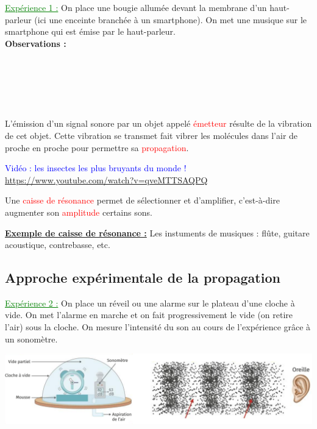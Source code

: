 \textcolor{green}{\underline{Expérience 1 :}} On place une bougie allumée devant la membrane d'un haut-parleur (ici une enceinte branchée à un smartphone). On met une musique sur le smartphone qui est émise par le haut-parleur.\\
\textbf{Observations :} \\
\\
\\
\\
\\
\\

\begin{tcolorbox}[colback=red!5!white,colframe=red!75!black,title=\textbf{Propriété de l'émission d'un son : }, upperbox=invisible]
L'émission d'un signal sonore par un objet appelé \textcolor{red}{émetteur} résulte de la vibration de cet objet. Cette vibration se transmet fait vibrer les molécules dans l'air de proche en proche pour permettre sa \textcolor{red}{propagation}.
\end{tcolorbox}

\textcolor{blue}{Vidéo : les insectes les plus bruyants du monde !} \url{https://www.youtube.com/watch?v=qveMTTSAQPQ}
\begin{tcolorbox}[colback=red!5!white,colframe=red!75!black,title=\textbf{Caisse de résonance : }, upperbox=invisible]
Une \textcolor{red}{caisse de résonance} permet de sélectionner et d'amplifier, c'est-à-dire augmenter son \textcolor{red}{amplitude} certains sons.
\end{tcolorbox}

\textbf{\underline{Exemple de caisse de résonance :}} Les instuments de musiques : flûte, guitare acoustique, contrebasse, etc.


\subsection{Approche expérimentale de la propagation}
\textcolor{green}{\underline{Expérience 2 :}} On place un réveil ou une alarme sur le plateau d'une cloche à vide. On met l'alarme en marche et on fait progressivement le vide (on retire l'air) sous la cloche. On mesure l'intensité du son au cours de l'expérience grâce à un sonomètre.
\begin{center}
    \includegraphics[scale=0.57]{Images/Chapitre_3/Propagation_exp.png}
\end{center}

